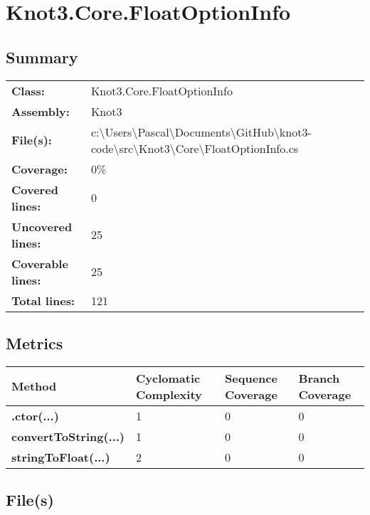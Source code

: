 \documentclass[a4paper,10pt]{article}
\begin{document}
\section{Knot3.Core.FloatOptionInfo}
\subsection{Summary}
\begin{longtable}[l]{ll}
\textbf{Class:} & Knot3.Core.FloatOptionInfo\\
\textbf{Assembly:} & Knot3\\
\textbf{File(s):} & \begin{minipage}[t]{12cm}{c:\textbackslash Users\textbackslash Pascal\textbackslash Documents\textbackslash GitHub\textbackslash knot3-code\textbackslash src\textbackslash Knot3\textbackslash Core\textbackslash FloatOptionInfo.cs}\end{minipage} \\
\textbf{Coverage:} & 0\%\\
\textbf{Covered lines:} & 0\\
\textbf{Uncovered lines:} & 25\\
\textbf{Coverable lines:} & 25\\
\textbf{Total lines:} & 121\\
\end{longtable}
\subsection{Metrics}
\begin{longtable}[l]{|l|l|l|l|}
\hline
\textbf{Method} & \textbf{Cyclomatic Complexity} & \textbf{Sequence Coverage} & \textbf{Branch Coverage}\\
\hline
\textbf{.ctor(...)} & 1 & 0 & 0\\
\hline
\textbf{convertToString(...)} & 1 & 0 & 0\\
\hline
\textbf{stringToFloat(...)} & 2 & 0 & 0\\
\hline
\end{longtable}
\subsection{File(s)}
\end{document}
